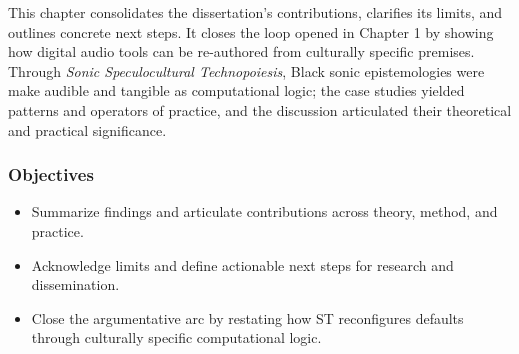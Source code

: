 


This chapter consolidates the dissertation’s contributions, clarifies its limits, and outlines concrete next steps. It closes the loop opened in Chapter 1 by showing how digital audio tools can be re-authored from culturally specific premises. Through \textit{Sonic Speculocultural Technopoiesis}, Black sonic epistemologies were make audible and tangible as computational logic; the case studies yielded patterns and operators of practice, and the discussion articulated their theoretical and practical significance.

\subsubsection{Objectives}
\begin{itemize}[nosep]
	\item Summarize findings and articulate contributions across theory, method, and practice.
	\item Acknowledge limits and define actionable next steps for research and dissemination.
	\item Close the argumentative arc by restating how ST reconfigures defaults through culturally specific computational logic.
\end{itemize}

